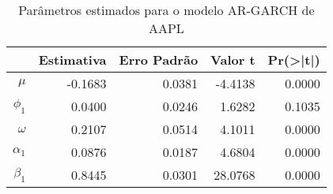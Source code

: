 \begin{table}[ht]
\centering
\caption{Par\^ametros estimados para o modelo AR-GARCH de AAPL} 
\label{tab:tabevtAAPL}
\begin{tabular}{rrrrr}
  \hline
 & Estimativa & Erro Padr\~ao & Valor t & Pr(>|t|) \\ 
  \hline
$\mu$ & -0.1683 & 0.0381 & -4.4138 & 0.0000 \\ 
  $\phi_1$ & 0.0400 & 0.0246 & 1.6282 & 0.1035 \\ 
  $\omega$ & 0.2107 & 0.0514 & 4.1011 & 0.0000 \\ 
  $\alpha_1$ & 0.0876 & 0.0187 & 4.6804 & 0.0000 \\ 
  $\beta_1$ & 0.8445 & 0.0301 & 28.0768 & 0.0000 \\ 
   \hline
\end{tabular}
\end{table}

